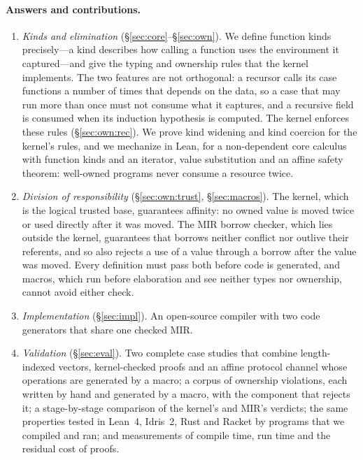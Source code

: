 \paragraph{Answers and contributions.}
\begin{enumerate}\setlength\itemsep{2pt}
\item \emph{Kinds and elimination} (\S\ref{sec:core}--\S\ref{sec:own}).
We define function kinds precisely---a kind describes how calling a function uses the environment it captured---and give the typing and ownership rules that the kernel implements.
The two features are not orthogonal: a recursor calls its case functions a number of times that depends on the data, so a case that may run more than once must not consume what it captures, and a recursive field is consumed when its induction hypothesis is computed.
The kernel enforces these rules (\S\ref{sec:own:rec}).
We prove kind widening and kind coercion for the kernel's rules, and we mechanize in Lean, for a non-dependent core calculus with function kinds and an iterator, value substitution and an affine safety theorem: well-owned programs never consume a resource twice.
\item \emph{Division of responsibility} (\S\ref{sec:own:trust}, \S\ref{sec:macros}).
The kernel, which is the logical trusted base, guarantees affinity: no owned value is moved twice or used directly after it was moved.
The MIR borrow checker, which lies outside the kernel, guarantees that borrows neither conflict nor outlive their referents, and so also rejects a use of a value through a borrow after the value was moved.
Every definition must pass both before code is generated, and macros, which run before elaboration and see neither types nor ownership, cannot avoid either check.
\item \emph{Implementation} (\S\ref{sec:impl}).
An open-source compiler with two code generators that share one checked MIR.
\item \emph{Validation} (\S\ref{sec:eval}).
Two complete case studies that combine length-indexed vectors, kernel-checked proofs and an affine protocol channel whose operations are generated by a macro; a corpus of ownership violations, each written by hand and generated by a macro, with the component that rejects it; a stage-by-stage comparison of the kernel's and MIR's verdicts; the same properties tested in Lean~4, Idris~2, Rust and Racket by programs that we compiled and ran; and measurements of compile time, run time and the residual cost of proofs.
\end{enumerate}

